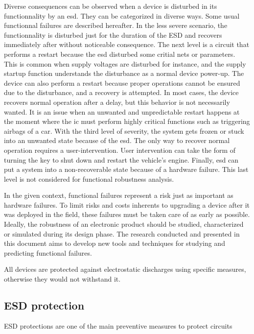 Diverse consequences can be observed when a device is disturbed in its functionnality by an \gls{esd}.
They can be categorized in diverse ways.
Some usual functionnal failures are described hereafter.
In the less severe scenario, the functionnality is disturbed just for the duration of the ESD and recovers immediately after without noticeable consequence.
The next level is a circuit that performs a restart because the \gls{esd} disturbed some critial nets or parameters.
This is common when supply voltages are disturbed for instance, and the supply startup function understands the disturbance as a normal device power-up.
The device can also perform a restart because proper operations cannot be ensured due to the disturbance, and a recovery is attempted.
In most cases, the device recovers normal operation after a delay, but this behavior is not necessarily wanted.
It is an issue when an unwanted and unpredictable restart happens at the moment where the \gls{ic} must perform highly critical functions such as triggering airbags of a car.
With the third level of severity, the system gets frozen or stuck into an unwanted state because of the \gls{esd}.
The only way to recover normal operation requires a user-intervention.
User intervention can take the form of turning the key to shut down and restart the vehicle's engine.
Finally, \gls{esd} can put a system into a non-recoverable state because of a hardware failure.
This last level is not considered for functional robustness analysis.

In the given context, functional failures represent a risk just as important as hardware failures.
To limit risks and costs inherents to upgrading a device after it was deployed in the field, these failures must be taken care of as early as possible.
Ideally, the robustness of an electronic product should be studied, characterized or simulated during its design phase.
The research conducted and presented in this document aims to develop new tools and techniques for studying and predicting functional failures.

All devices are protected against electrostatic discharges using specific measures, otherwise they would not withstand it.

\subsection{ESD protection}

ESD protections are one of the main preventive measures to protect circuits

